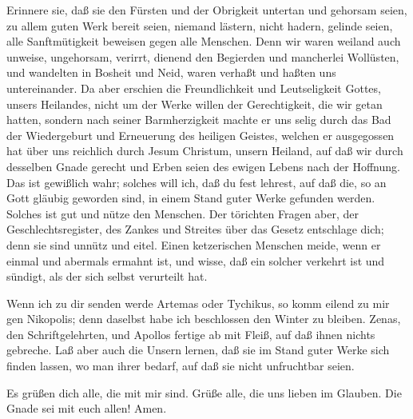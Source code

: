  Erinnere sie, daß sie den Fürsten und der Obrigkeit
untertan und gehorsam seien, zu allem guten Werk bereit seien,
 niemand lästern, nicht hadern, gelinde seien, alle
Sanftmütigkeit beweisen gegen alle Menschen.  Denn wir waren
weiland auch unweise, ungehorsam, verirrt, dienend den Begierden und
mancherlei Wollüsten, und wandelten in Bosheit und Neid, waren verhaßt
und haßten uns untereinander.  Da aber erschien die
Freundlichkeit und Leutseligkeit Gottes, unsers Heilandes, 
nicht um der Werke willen der Gerechtigkeit, die wir getan hatten,
sondern nach seiner Barmherzigkeit machte er uns selig durch das Bad der
Wiedergeburt und Erneuerung des heiligen Geistes,  welchen
er ausgegossen hat über uns reichlich durch Jesum Christum, unsern
Heiland,  auf daß wir durch desselben Gnade gerecht und
Erben seien des ewigen Lebens nach der Hoffnung.  Das ist
gewißlich wahr; solches will ich, daß du fest lehrest, auf daß die, so
an Gott gläubig geworden sind, in einem Stand guter Werke gefunden
werden. Solches ist gut und nütze den Menschen.  Der
törichten Fragen aber, der Geschlechtsregister, des Zankes und Streites
über das Gesetz entschlage dich; denn sie sind unnütz und eitel.
 Einen ketzerischen Menschen meide, wenn er einmal und
abermals ermahnt ist,  und wisse, daß ein solcher verkehrt
ist und sündigt, als der sich selbst verurteilt hat.

 Wenn ich zu dir senden werde Artemas oder Tychikus, so
komm eilend zu mir gen Nikopolis; denn daselbst habe ich beschlossen den
Winter zu bleiben.  Zenas, den Schriftgelehrten, und
Apollos fertige ab mit Fleiß, auf daß ihnen nichts gebreche.
 Laß aber auch die Unsern lernen, daß sie im Stand guter
Werke sich finden lassen, wo man ihrer bedarf, auf daß sie nicht
unfruchtbar seien.

 Es grüßen dich alle, die mit mir sind. Grüße alle, die uns
lieben im Glauben. Die Gnade sei mit euch allen! Amen.
